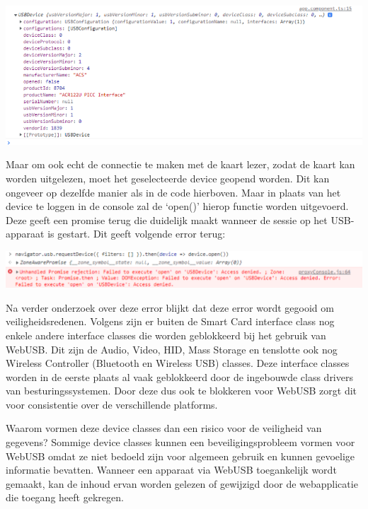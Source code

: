 \begin{center}
    \includegraphics[width=16cm]{device_log}
\end{center}

Maar om ook echt de connectie te maken met de kaart lezer, zodat de kaart kan worden uitgelezen, moet het geselecteerde device geopend worden. Dit kan ongeveer op dezelfde manier als in de code hierboven. Maar in plaats van het device te loggen in de console zal de ‘open()’ hierop functie worden uitgevoerd. Deze geeft een promise terug die duidelijk maakt wanneer de sessie op het USB-apparaat is gestart. Dit geeft volgende error terug: 

\begin{center}
    \includegraphics[width=16cm]{webusb_error}
\end{center}

Na verder onderzoek over deze error blijkt dat deze error wordt gegooid om veiligheidsredenen. Volgens \textcite{ReillyGrant} zijn er buiten de Smart Card interface class nog enkele andere interface classes die worden geblokkeerd bij het gebruik van WebUSB. Dit zijn de Audio, Video, HID, Mass Storage en tenslotte ook nog Wireless Controller (Bluetooth en Wireless USB) classes. Deze interface classes worden in de eerste plaats al vaak geblokkeerd door de ingebouwde class drivers van besturingssystemen. Door deze dus ook te blokkeren voor WebUSB zorgt dit voor consistentie over de verschillende platforms. 

Waarom vormen deze device classes dan een risico voor de veiligheid van gegevens? Sommige device classes kunnen een beveiligingsprobleem vormen voor WebUSB omdat ze niet bedoeld zijn voor algemeen gebruik en kunnen gevoelige informatie bevatten. Wanneer een apparaat via WebUSB toegankelijk wordt gemaakt, kan de inhoud ervan worden gelezen of gewijzigd door de webapplicatie die toegang heeft gekregen. 

